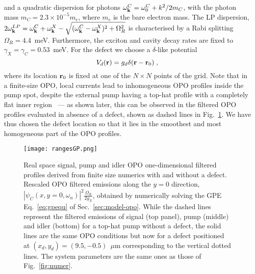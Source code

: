 \begin{subappendices}
and a quadratic dispersion for photons $\omega^C_{\mathbf{k}} =
\omega^C_0 + k^2/2m_C$, with the photon mass $m_C=2.3 \times 10^{-5}
m_e$, where $m_e$ is the bare electron mass. The LP dispersion, $2
\omega_{\mathbf{k}}^{LP} = \omega_{\mathbf{k}}^{C} + \omega_{\mathbf{k}}^{X}
- \sqrt{(\omega_{\mathbf{k}}^{C} - \omega_{\mathbf{k}}^{X})^2 +
  \Omega_R^2}$ is characterised by a Rabi splitting $\Omega_R =
4.4$~meV. Furthermore, the exciton and cavity decay rates are fixed to
$\gamma_X=\gamma_C=0.53$~meV.
%
For the defect we choose a $\delta$-like potential
%
\begin{equation}
  V_d(\mathbf{r}) = g_d \delta(\mathbf{r} - \mathbf{r}_0)\; ,
\end{equation}
%
where its location $\mathbf{r}_0$ is fixed at one of the $N \times N$
points of the grid.
%
Note that in a finite-size OPO, local currents lead to inhomogeneous
OPO profiles inside the pump spot, despite the external pump having
a top-hat profile with a completely flat inner
region~\cite{Marchetti_2010,9783642241857} --- as shown later, this
can be observed in the filtered OPO profiles evaluated in absence of a
defect, shown as dashed lines in Fig.~\ref{fig:rafull}.
%
We have thus chosen the defect location so that it lies in the
smoothest and most homogeneous part of the OPO profiles.
%
\begin{figure}[tb]\centering
\texttt{[image: rangesGP.png]}
\caption{Real space signal, pump and idler OPO one-dimensional
  filtered profiles derived from finite size numerics with and without
  a defect. Rescaled OPO filtered emissions along the $y=0$ direction,
  $|\psi_C(x,y=0,\omega_n)|^2 \frac{\Omega_R}{2g_X}$, obtained by
  numerically solving the GPE Eq.~\eqref{eq:gpequ} of
  Sec.~\ref{sec:model-opo}. While the dashed lines represent the
  filtered emissions of signal (top panel), pump (middle) and idler
  (bottom) for a top-hat pump without a defect, the solid lines are
  the same OPO conditions but now for a defect positioned at
  $(x_d, y_d) = (9.5, -0.5)$~$\mu$m corresponding to the vertical
  dotted lines. The system parameters are the same ones as those of
  Fig.~\ref{fig:numer}.}
\label{fig:rafull}
\end{figure}
%


\end{subappendices}
